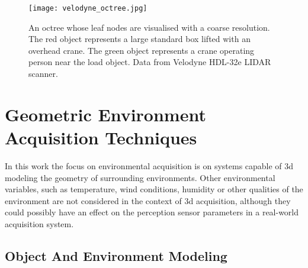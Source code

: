 \documentclass[12pt,a4paper,oneside,pdftex]{report}
\begin{document}

    
    
\begin{figure}[ht]
  \begin{center}
    \texttt{[image: velodyne\_octree.jpg]}
    \caption{An octree whose leaf nodes are visualised with a coarse resolution. The red object represents a large standard box lifted with an overhead crane. The green object represents a crane operating person near the load object. Data from Velodyne HDL-32e LIDAR scanner.}
    \label{fig:velodyne_octree}
  \end{center}
\end{figure}

\section{Geometric Environment Acquisition Techniques}
\label{section:environment_acquisition_techniques}

In this work the focus on environmental acquisition is on systems capable of 3d modeling the geometry of surrounding environments. Other environmental variables, such as temperature, wind conditions, humidity or other qualities of the environment are not considered in the context of 3d acquisition, although they could possibly have an effect on the perception sensor parameters in a real-world acquisition system. 

\subsection{Object And Environment Modeling}
\label{subsection:object_and_environment_modeling}
\end{document}

